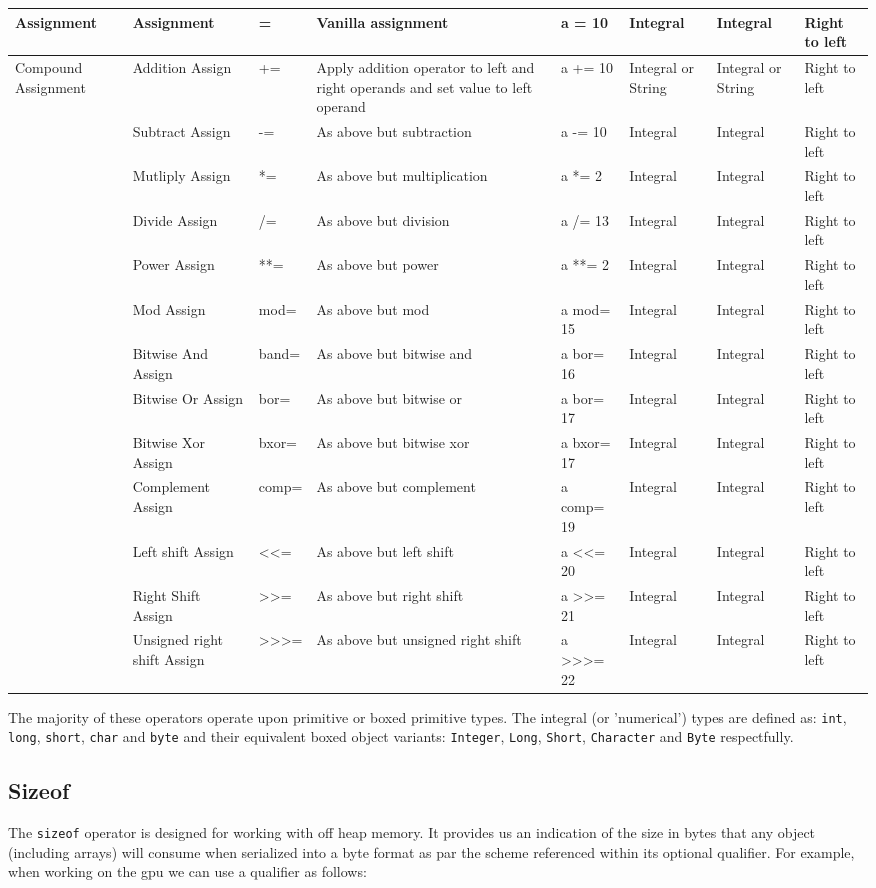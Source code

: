 \documentclass[conc-doc]{subfiles}
\begin{document}
{\begin{longtable}[hbt!]{| l | l | l | l | l | l | l | l |}
Assignment& Assignment& =& Vanilla assignment& a = 10& Integral& Integral& Right to left\\ \hline

Compound Assignment& Addition Assign& +=& Apply addition operator to left and right operands and set value to left operand& a += 10& Integral or String& Integral or String& Right to left\\
& Subtract Assign& -=& As above but subtraction& a -= 10& Integral& Integral& Right to left\\
& Mutliply Assign& *=& As above but multiplication& a *= 2& Integral& Integral& Right to left\\
& Divide Assign& /=& As above but division& a /= 13& Integral& Integral& Right to left\\
& Power Assign& **=& As above but power& a **= 2& Integral& Integral& Right to left\\
& Mod Assign& mod=& As above but mod& a mod= 15& Integral& Integral& Right to left\\
& Bitwise And Assign& band=& As above but bitwise and& a bor= 16& Integral& Integral& Right to left\\
& Bitwise Or Assign& bor=& As above but bitwise or& a bor= 17& Integral& Integral& Right to left\\
& Bitwise Xor Assign& bxor=& As above but bitwise xor& a bxor= 17& Integral& Integral& Right to left\\
& Complement Assign& comp=& As above but complement& a comp= 19& Integral& Integral& Right to left\\
& Left shift Assign& <<=& As above but left shift& a <<= 20& Integral& Integral& Right to left\\
& Right Shift Assign& >>=& As above but right shift& a >>= 21& Integral& Integral& Right to left\\
& Unsigned right shift Assign& >>>=& As above but unsigned right shift& a >>>= 22& Integral& Integral& Right to left\\
\end{longtable}
}

The majority of these operators operate upon primitive or boxed primitive types. The integral (or 'numerical') types are defined as: \lstinline{int}, \lstinline{long}, \lstinline{short}, \lstinline{char} and \lstinline{byte} and their equivalent boxed object variants: \lstinline{Integer}, \lstinline{Long}, \lstinline{Short}, \lstinline{Character} and \lstinline{Byte} respectfully.

\subsection{Sizeof}
The \lstinline{sizeof} operator is designed for working with off heap memory. It provides us an indication of the size in bytes that any object (including arrays) will consume when serialized into a byte format as par the scheme referenced within its optional qualifier. For example, when working on the gpu we can use a qualifier as follows:
\end{document}
